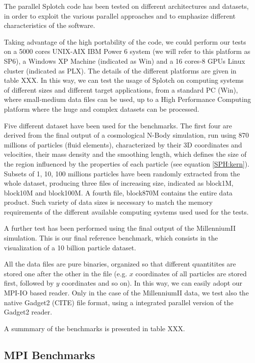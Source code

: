 The parallel Splotch code has been tested on different architectures and datasets, in order to 
exploit the various parallel approaches and to emphasize different characteristics of the software.

Taking advantage of the high portability of the code, we could perform our tests on a 5000 cores UNIX-AIX 
IBM Power 6 system (we will refer to this platform as SP6), a Windows XP Machine (indicated as Win)
and a 16 cores-8 GPUs Linux cluster (indicated as PLX). The details of the different platforms are given 
in table XXX. In this way, we can test the usage of Splotch on computing systems 
of different sizes and different target applications, from a standard PC (Win), where small-medium
data files can be used, up to 
a High Performance Computing platform where the huge and complex datasets can be processed.

Five different dataset have been used for the benchmarks. The first four are derived from 
the final output of a cosmological N-Body simulation, run using 870 millions of particles 
(fluid elements), characterized by their 3D coordinates and velocities, their mass density 
and the smoothing length, which defines the size of the region influenced by the properties
of each particle (see equation \ref{SPH:kern}). Subsets of 1, 10, 100 millions particles have been
randomly extracted from the whole dataset, producing three files of increasing size, indicated as
block1M, block10M and block100M. A fourth file, block870M contains the entire data product. 
Such variety of data sizes is necessary to match the memory requirements of the different available 
computing systems used used for the tests.

A further test has been performed using the final output of the MillenniumII simulation. 
This is our final reference benchmark, which consists in the visualization of a 10 billion
particle dataset.

All the data files are pure binaries, organized so that different quantitites are stored one after
the other in the file (e.g. $x$ coordinates of all particles are stored first, followed by $y$ 
coordinates and so on). In this way, we can easily adopt our MPI-IO based
reader. Only in the case of the MillenniumII data, we test also the native 
Gadget2 (CITE) file format, using a integrated parallel version of the Gadget2 reader.

A summmary of the benchmarks is presented in table XXX. 

\subsection{MPI Benchmarks}

